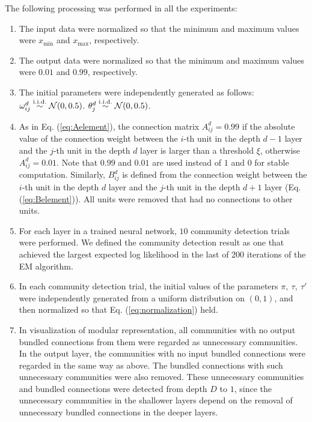 \documentclass[12pt]{article} %
\begin{document}
The following processing was performed in all the experiments:
\begin{enumerate}
\setlength{\itemsep}{0cm}
\setlength{\parskip}{0cm}
\renewcommand{\labelenumi}{(\arabic{enumi})}
\item The input data were normalized so that the minimum and maximum values were $x_{\mathrm{min}}$ and $x_{\mathrm{max}}$, respectively.
\item The output data were normalized so that the minimum and maximum values were $0.01$ and $0.99$, respectively.
\item The initial parameters were independently generated as follows: $\omega^d_{ij}\overset{\text\small\rm{i.i.d.}}{\sim} \mathcal{N}(0,0.5)$. $\theta^d_j\overset{\text\small\rm{i.i.d.}}{\sim} \mathcal{N}(0,0.5)$.
\item As in Eq. (\ref{eq:Aelement}),  the connection matrix $A^d_{ij}=0.99$ if the absolute value of the connection weight between the $i$-th unit in the depth $d-1$ layer and the $j$-th unit in the depth $d$ layer is larger than a threshold $\xi$, otherwise $A^d_{ij}=0.01$. Note that $0.99$ and $0.01$ are used instead of $1$ and $0$ for stable computation. Similarly, $B^d_{ij}$ is defined from the connection weight between the $i$-th unit in the depth $d$ layer and the $j$-th unit in the depth $d+1$ layer (Eq. (\ref{eq:Belement})). All units were removed that had no connections to other units.
\item For each layer in a trained neural network, $10$ community detection trials were performed. We defined the community detection result as one that achieved the largest expected log likelihood in the last of $200$ iterations of the EM algorithm.
\item In each community detection trial, the initial values of the parameters $\pi,\ \tau,\ \tau'$ were independently generated from a uniform distribution on $(0,1)$, and then normalized so that Eq. (\ref{eq:normalization}) held. 
\item In visualization of modular representation, all communities with no output bundled connections from them were regarded as unnecessary communities. 
In the output layer, the communities with no input bundled connections were regarded in the same way as above. The bundled connections with such unnecessary communities were also removed. 
These unnecessary communities and bundled connections were detected from depth $D$ to $1$, since the unnecessary communities in the shallower layers depend on the removal of unnecessary bundled connections in the deeper layers. 
\end{enumerate}
\end{document}
